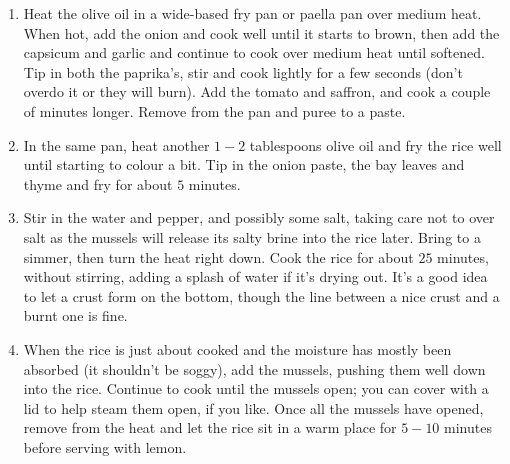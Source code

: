 \documentclass[11pt,a4paper]{article}
\begin{document}
\begin{enumerate}
  \item Heat the olive oil in a wide-based fry pan or paella pan over medium heat. When hot, add the onion and cook well until it starts to brown, then add the capsicum and garlic and continue to cook over medium heat until softened. Tip in both the paprika's, stir and cook lightly for a few seconds (don't overdo it or they will burn). Add the tomato and saffron, and cook a couple of minutes longer. Remove from the pan and puree to a paste.
  \item In the same pan, heat another $1 - 2$ tablespoons olive oil and fry the rice well until starting to colour a bit. Tip in the onion paste, the bay leaves and thyme and fry for about $5$ minutes.
  \item Stir in the water and pepper, and possibly some salt, taking care not to over salt as the mussels will release its salty brine into the rice later. Bring to a simmer, then turn the heat right down. Cook the rice for about $25$ minutes, without stirring, adding a splash of water if it's drying out. It’s a good idea to let a crust form on the bottom, though the line between a nice crust and a burnt one is fine.
  \item When the rice is just about cooked and the moisture has mostly been absorbed (it shouldn't be soggy), add the mussels, pushing them well down into the rice. Continue to cook until the mussels open; you can cover with a lid to help steam them open, if you like. Once all the mussels have opened, remove from the heat and let the rice sit in a warm place for $5 - 10$ minutes before serving with lemon.
\end{enumerate}
\end{document}
